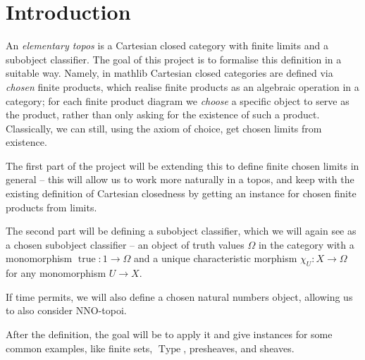 %

\section{Introduction}

An \emph{elementary topos} is a Cartesian closed category with finite limits and a subobject classifier. The goal of this project is to formalise this definition in a suitable way. Namely, in mathlib Cartesian closed categories are defined via \emph{chosen} finite products, which realise finite products as an algebraic operation in a category; for each finite product diagram we \emph{choose} a specific object to serve as the product, rather than only asking for the existence of such a product. Classically, we can still, using the axiom of choice, get chosen limits from existence.

The first part of the project will be extending this to define finite chosen limits in general -- this will allow us to work more naturally in a topos, and keep with the existing definition of Cartesian closedness by getting an instance for chosen finite products from limits.

The second part will be defining a subobject classifier, which we will again see as a chosen subobject classifier -- an object of truth values $\Omega$ in the category with a monomorphism $\operatorname{true} : 1 \rightarrow \Omega$ and a unique characteristic morphism $\chi_{U} : X \rightarrow \Omega$ for any monomorphism $U \rightarrow X$.

If time permits, we will also define a chosen natural numbers object, allowing us to also consider NNO-topoi.

After the definition, the goal will be to apply it and give instances for some common examples, like finite sets, $\operatorname{Type}$, presheaves, and sheaves.


